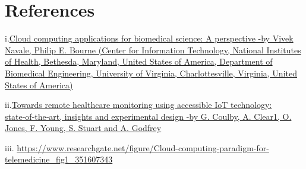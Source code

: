 \documentclass[12pt]{article}
\begin{document}
	\section{References}
	
	i.\href{https://journals.plos.org/ploscompbiol/article?id=10.1371/journal.pcbi.1006144}{Cloud computing applications for biomedical
		science: A perspective
		-by Vivek Navale, Philip E. Bourne
		(Center for Information Technology, National Institutes of Health, Bethesda, Maryland, United States of America,  Department of Biomedical Engineering, University of Virginia, Charlottesville, Virginia, United States of America)}
	 
	\vspace{5mm}
	ii.\href{https://doi.org/10.1186/s12938-020-00825-9}{Towards remote healthcare monitoring 
		using accessible IoT technology: state‑of‑the‑art, insights and experimental design
		-by G. Coulby, A. Clear1, O. Jones, F. Young, S. Stuart and A. Godfrey}
		
	\vspace{5mm}
	iii. \url{https://www.researchgate.net/figure/Cloud-computing-paradigm-for-telemedicine_fig1_351607343}
	 
	
\end{document}
